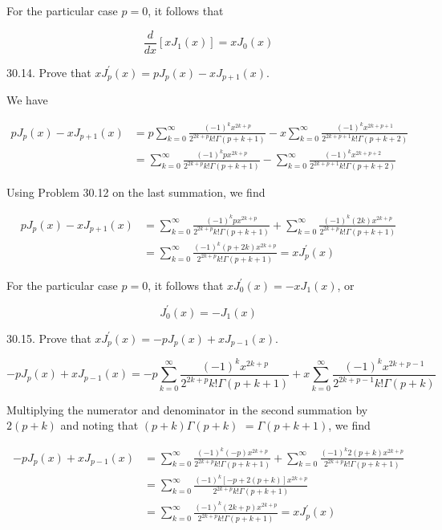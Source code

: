 \documentclass[10pt]{article}
\begin{document}
For the particular case $p=0$, it follows that


\begin{equation*}
\frac{d}{d x}\left[x J_{1}(x)\right]=x J_{0}(x) \tag{1}
\end{equation*}


30.14. Prove that $x J_{p}^{\prime}(x)=p J_{p}(x)-x J_{p+1}(x)$.

We have

$$
\begin{aligned}
p J_{p}(x)-x J_{p+1}(x) & =p \sum_{k=0}^{\infty} \frac{(-1)^{k} x^{2 k+p}}{2^{2 k+p} k ! \Gamma(p+k+1)}-x \sum_{k=0}^{\infty} \frac{(-1)^{k} x^{2 k+p+1}}{2^{2 k+p+1} k ! \Gamma(p+k+2)} \\
& =\sum_{k=0}^{\infty} \frac{(-1)^{k} p x^{2 k+p}}{2^{2 k+p} k ! \Gamma(p+k+1)}-\sum_{k=0}^{\infty} \frac{(-1)^{k} x^{2 k+p+2}}{2^{2 k+p+1} k ! \Gamma(p+k+2)}
\end{aligned}
$$

Using Problem 30.12 on the last summation, we find

$$
\begin{aligned}
p J_{p}(x)-x J_{p+1}(x) & =\sum_{k=0}^{\infty} \frac{(-1)^{k} p x^{2 k+p}}{2^{2 k+p} k ! \Gamma(p+k+1)}+\sum_{k=0}^{\infty} \frac{(-1)^{k}(2 k) x^{2 k+p}}{2^{2 k+p} k ! \Gamma(p+k+1)} \\
& =\sum_{k=0}^{\infty} \frac{(-1)^{k}(p+2 k) x^{2 k+p}}{2^{2 k+p} k ! \Gamma(p+k+1)}=x J_{p}^{\prime}(x)
\end{aligned}
$$

For the particular case $p=0$, it follows that $x J_{0}^{\prime}(x)=-x J_{1}(x)$, or


\begin{equation*}
J_{0}^{\prime}(x)=-J_{1}(x) \tag{1}
\end{equation*}


30.15. Prove that $x J_{p}^{\prime}(x)=-p J_{p}(x)+x J_{p-1}(x)$.

$$
-p J_{p}(x)+x J_{p-1}(x)=-p \sum_{k=0}^{\infty} \frac{(-1)^{k} x^{2 k+p}}{2^{2 k+p} k ! \Gamma(p+k+1)}+x \sum_{k=0}^{\infty} \frac{(-1)^{k} x^{2 k+p-1}}{2^{2 k+p-1} k ! \Gamma(p+k)}
$$

Multiplying the numerator and denominator in the second summation by $2(p+k)$ and noting that $(p+k) \Gamma(p+k)$ $=\Gamma(p+k+1)$, we find

$$
\begin{aligned}
-p J_{p}(x)+x J_{p-1}(x) & =\sum_{k=0}^{\infty} \frac{(-1)^{k}(-p) x^{2 k+p}}{2^{2 k+p} k ! \Gamma(p+k+1)}+\sum_{k=0}^{\infty} \frac{(-1)^{k} 2(p+k) x^{2 k+p}}{2^{2 k+p} k ! \Gamma(p+k+1)} \\
& =\sum_{k=0}^{\infty} \frac{(-1)^{k}[-p+2(p+k)] x^{2 k+p}}{2^{2 k+p} k ! \Gamma(p+k+1)} \\
& =\sum_{k=0}^{\infty} \frac{(-1)^{k}(2 k+p) x^{2 k+p}}{2^{2 k+p} k ! \Gamma(p+k+1)}=x J_{p}^{\prime}(x)
\end{aligned}
$$
\end{document}
